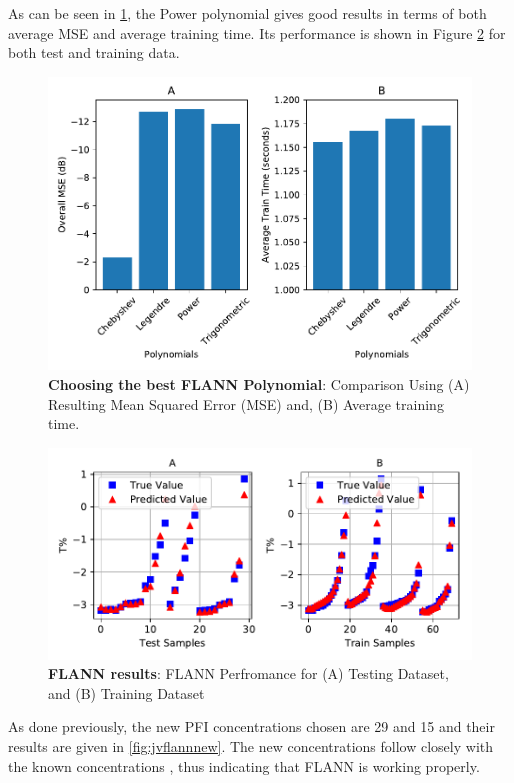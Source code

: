 \documentclass[]{article}
\begin{document}
As can be seen in \ref{fig:jvflannbar2}, the Power polynomial gives good results in terms of both average MSE and average training time. Its performance is shown in Figure \ref{fig:jvflannplot2} for both test and training data.

\begin{figure}
\centering
\includegraphics{Report_files/figure-latex/jvflannbar2-1.pdf}
\caption{\label{fig:jvflannbar2}\textbf{Choosing the best FLANN Polynomial}: Comparison Using (A) Resulting Mean Squared Error (MSE) and, (B) Average training time.}
\end{figure}

\begin{figure}
\centering
\includegraphics{Report_files/figure-latex/jvflannplot2-1.pdf}
\caption{\label{fig:jvflannplot2}\textbf{FLANN results}: FLANN Perfromance for (A) Testing Dataset, and (B) Training Dataset}
\end{figure}

As done previously, the new PFI concentrations chosen are 29 and 15 and their results are given in \ref{fig:jvflannnew}. The new concentrations follow closely with the known concentrations , thus indicating that FLANN is working properly.
\end{document}
